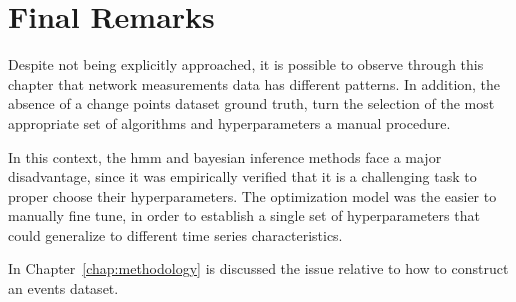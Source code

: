 \section{Final Remarks}

Despite not being explicitly approached, it is possible to observe
through this chapter
that network measurements data has different patterns.
In addition, the absence of a change points dataset ground truth, turn the
selection of the most appropriate set of algorithms and hyperparameters
a manual procedure.

In this context, the \gls*{hmm} and bayesian inference methods face a major
disadvantage, since it was empirically verified that it is a challenging task to
proper choose their hyperparameters.
The optimization model was the easier to manually fine tune,
in order to establish a single set of hyperparameters that could
generalize to different time series characteristics.

In Chapter~\ref{chap:methodology} is discussed the issue relative to how to
construct an events dataset.
